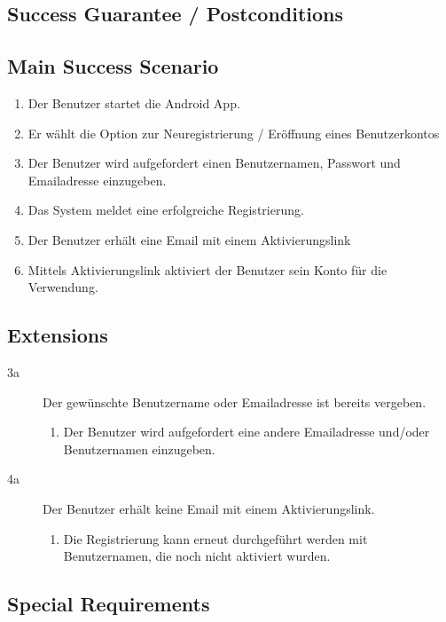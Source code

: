 \documentclass[10pt,a4paper]{scrartcl}
\begin{document}
\subsection*{Success Guarantee / Postconditions}


\subsection*{Main Success Scenario}

\begin{enumerate}
\item Der Benutzer startet die Android App.
\item Er wählt die Option zur Neuregistrierung / Eröffnung eines Benutzerkontos
\item Der Benutzer wird aufgefordert einen Benutzernamen, Passwort und Emailadresse einzugeben.
\item Das System meldet eine erfolgreiche Registrierung.
\item Der Benutzer erhält eine Email mit einem Aktivierungslink
\item Mittels Aktivierungslink aktiviert der Benutzer sein Konto für die Verwendung. 
\end{enumerate}


\subsection*{Extensions}

\begin{description}
\item[3a] Der gewünschte Benutzername oder Emailadresse ist bereits vergeben.
	\begin{enumerate}
	\item Der Benutzer wird aufgefordert eine andere Emailadresse und/oder Benutzernamen 		einzugeben.
	\end{enumerate}
\item[4a] Der Benutzer erhält keine Email mit einem Aktivierungslink.
	\begin{enumerate}
	\item Die Registrierung kann erneut durchgeführt werden mit Benutzernamen, die noch nicht aktiviert wurden.
	\end{enumerate}

\end{description}


\subsection*{Special Requirements}
\end{document}

